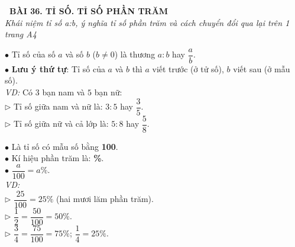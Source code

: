 \documentclass[14pt,a4paper,oneside]{extbook}
\begin{document}
\noindent
\begin{tcolorbox}[
  enhanced,
  colback=teal!8!white,
  colframe=teal!80!black,
  arc=3mm,
  boxrule=1.1pt,
  width=\linewidth,
  halign=center,
  top=2.2mm, bottom=2.2mm,
  left=3mm, right=3mm,
  drop fuzzy shadow
]
  {\large\bfseries\color{teal!95!black}\faBookmark\ BÀI 36. TỈ SỐ. TỈ SỐ PHẦN TRĂM}\\[2pt]
  {\scriptsize\color{black!75}\itshape Khái niệm tỉ số a:b, ý nghĩa tỉ số phần trăm và cách chuyển đổi qua lại trên 1 trang A4}
\end{tcolorbox}

\vspace{3.2mm}
\noindent
\begin{minipage}[t]{0.50\textwidth}
  \begin{tcolorbox}[
    enhanced,
    title={\footnotesize\bfseries\color{white}\faSliders\ 1. Tỉ số của hai số},
    colback=blue!2!white,
    colframe=blue!75!black,
    arc=2.5mm, boxrule=0.8pt, top=1.8mm, bottom=1.8mm, left=2.2mm, right=2.2mm
  ]
    \footnotesize
    $\bullet$ Tỉ số của số $a$ và số $b$ ($b \neq 0$) là thương $a : b$ hay $\dfrac{a}{b}$.\\
    $\bullet$ \textbf{Lưu ý thứ tự}: Tỉ số của $a$ và $b$ thì $a$ viết trước (ở tử số), $b$ viết sau (ở mẫu số).\\
    \textit{VD:} Có $3$ bạn nam và $5$ bạn nữ:\\
    $\triangleright$ Tỉ số giữa nam và nữ là: $3 : 5$ hay $\dfrac{3}{5}$.\\
    $\triangleright$ Tỉ số giữa nữ và cả lớp là: $5 : 8$ hay $\dfrac{5}{8}$.
  \end{tcolorbox}
\end{minipage}%
\hfill
\begin{minipage}[t]{0.48\textwidth}
  \begin{tcolorbox}[
    enhanced,
    title={\footnotesize\bfseries\color{white}\faPercent\ 2. Tỉ số phần trăm},
    colback=teal!2!white,
    colframe=teal!75!black,
    arc=2.5mm, boxrule=0.8pt, top=1.8mm, bottom=1.8mm, left=2mm, right=2mm
  ]
    \footnotesize
    $\bullet$ Là tỉ số có mẫu số bằng \textbf{100}.\\
    $\bullet$ Kí hiệu phần trăm là: \textbf{\%}.\\
    $\bullet$ $\dfrac{a}{100} = a\%$.\\
    \textit{VD:}\\
    $\triangleright$ $\dfrac{25}{100} = 25\%$ (hai mươi lăm phần trăm).\\
    $\triangleright$ $\dfrac{1}{2} = \dfrac{50}{100} = 50\%$.\\
    $\triangleright$ $\dfrac{3}{4} = \dfrac{75}{100} = 75\%$; $\dfrac{1}{4} = 25\%$.
  \end{tcolorbox}
\end{minipage}
\end{document}
